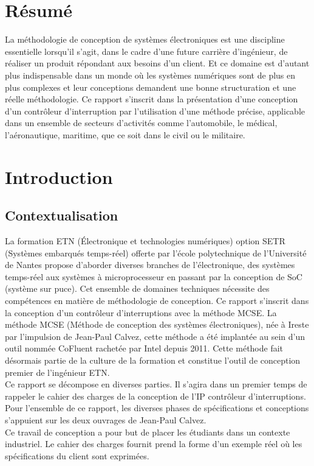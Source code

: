 \vspace*{4cm}
\section*{Résumé}
La méthodologie de conception de systèmes électroniques est une discipline essentielle lorsqu'il s'agit, dans le cadre d'une future carrière d'ingénieur, de réaliser un produit répondant aux besoins d'un client. 
Et ce domaine est d'autant plus indispensable dans un monde où les systèmes numériques sont de plus en plus complexes et leur conceptions demandent une bonne structuration et une réelle méthodologie. 
Ce rapport s'inscrit dans la présentation d'une conception d'un contrôleur d'interruption par l'utilisation d'une méthode précise, applicable dans un ensemble de secteurs d'activités comme l'automobile, le médical, l'aéronautique, maritime, que ce soit dans le civil ou le militaire.


\newpage



\section{Introduction}

\subsection{Contextualisation}
La formation ETN (Électronique et technologies numériques) option SETR (Systèmes embarqués temps-réel) offerte par l'école polytechnique de l'Université de Nantes propose d'aborder diverses branches de l'électronique, des systèmes temps-réel aux systèmes à microprocesseur en passant par la conception de SoC (système sur puce). 
Cet ensemble de domaines techniques nécessite des compétences en matière de méthodologie de conception. Ce rapport s'inscrit dans la conception d'un contrôleur d'interruptions avec la méthode MCSE. 
La méthode MCSE (Méthode de conception des systèmes électroniques), née à Ireste par l'impulsion de Jean-Paul Calvez, cette méthode a été implantée au sein d'un outil nommée CoFluent rachetée par Intel\mbox{\textregistered } depuis 2011. Cette méthode fait désormais partie de la culture de la formation et constitue l'outil de conception premier de l'ingénieur ETN.\\
Ce rapport se décompose en diverses parties. 
Il s'agira dans un premier temps de rappeler le cahier des charges de la conception de l'IP contrôleur d'interruptions.
Pour l'ensemble de ce rapport, les diverses phases de spécifications et conceptions s'appuient sur les deux ouvrages de Jean-Paul Calvez. \cite{Calvez_1} \cite{Calvez_2} \\
Ce travail de conception a pour but de placer les étudiants dans un contexte industriel. Le cahier des charges fournit prend la forme d'un exemple réel où les spécifications du client sont exprimées.


